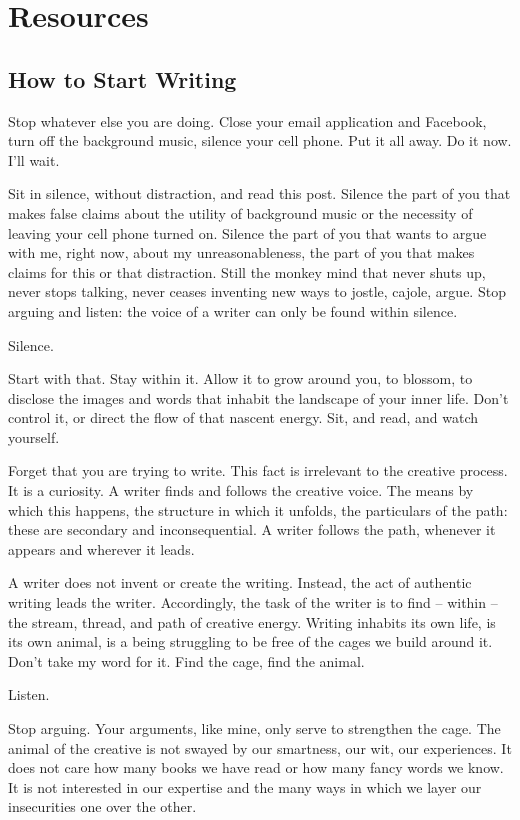 \documentclass[letterpaper,10pt,headsepline]{scrreprt}
\begin{document}
\section{Resources}
\subsection{How to Start Writing}

Stop whatever else you are doing. Close your email application and Facebook, turn off the background music, silence your cell phone. Put it all away. Do it now. I'll wait.

Sit in silence, without distraction, and read this post. Silence the part of you that makes false claims about the utility of background music or the necessity of leaving your cell phone turned on. Silence the part of you that wants to argue with me, right now, about my unreasonableness, the part of you that makes claims for this or that distraction. Still the monkey mind that never shuts up, never stops talking, never ceases inventing new ways to jostle, cajole, argue. Stop arguing and listen: the voice of a writer can only be found within silence.

Silence.

Start with that. Stay within it. Allow it to grow around you, to blossom, to disclose the images and words that inhabit the landscape of your inner life. Don't control it, or direct the flow of that nascent energy. Sit, and read, and watch yourself.

Forget that you are trying to write. This fact is irrelevant to the creative process. It is a curiosity. A writer finds and follows the creative voice. The means by which this happens, the structure in which it unfolds, the particulars of the path: these are secondary and inconsequential. A writer follows the path, whenever it appears and wherever it leads.

A writer does not invent or create the writing. Instead, the act of authentic writing leads the writer. Accordingly, the task of the writer is to find -- within -- the stream, thread, and path of creative energy. Writing inhabits its own life, is its own animal, is a being struggling to be free of the cages we build around it. Don't take my word for it. Find the cage, find the animal.

Listen.

Stop arguing. Your arguments, like mine, only serve to strengthen the cage. The animal of the creative is not swayed by our smartness, our wit, our experiences. It does not care how many books we have read or how many fancy words we know. It is not interested in our expertise and the many ways in which we layer our insecurities one over the other.
\end{document}
